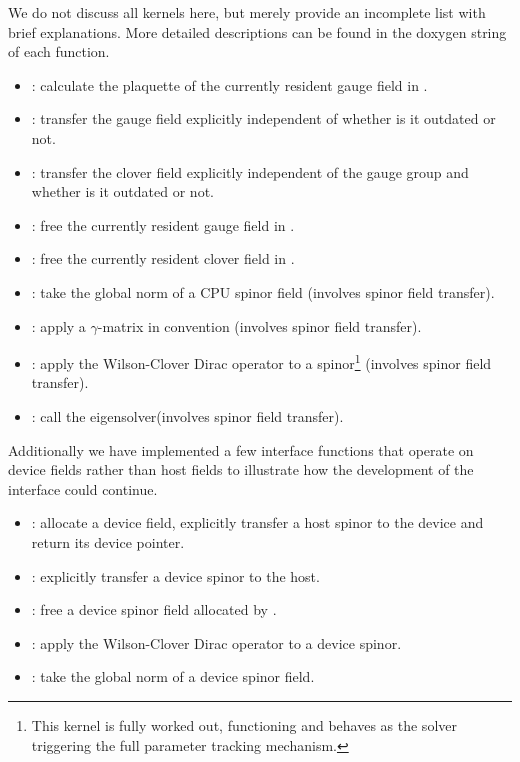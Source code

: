 We do not discuss all kernels here, but merely provide an incomplete list with brief explanations. More detailed descriptions can be found in the doxygen string of each function.
\begin{itemize}
  \item {}: calculate the plaquette of the currently resident gauge field in \quda.
  \item {}: transfer the gauge field explicitly independent of whether is it outdated or not.
  \item {}: transfer the clover field explicitly independent of the gauge group and whether is it outdated or not.
  \item {}: free the currently resident gauge field in \quda.
  \item {}: free the currently resident clover field in \quda.
  \item {}: take the global norm of a CPU spinor field (involves spinor field transfer).
  \item {}: apply a $\gamma$-matrix in \openqxd convention (involves spinor field transfer).
  \item {}: apply the Wilson-Clover Dirac operator to a spinor\footnote{This kernel is fully worked out, functioning and behaves as the solver triggering the full parameter tracking mechanism.} (involves spinor field transfer).
  \item {}: call the eigensolver\footnotemark[\value{footnote}] (involves spinor field transfer).
\end{itemize}

Additionally we have implemented a few interface functions that operate on device fields rather than host fields to illustrate how the development of the interface could continue.
\begin{itemize}
  \item {}: allocate a device field, explicitly transfer a host spinor to the device and return its device pointer.
  \item {}: explicitly transfer a device spinor to the host.
  \item {}: free a device spinor field allocated by .
  \item {}: apply the Wilson-Clover Dirac operator to a device spinor\footnotemark[\value{footnote}].
  \item {}: take the global norm of a device spinor field.
\end{itemize}

